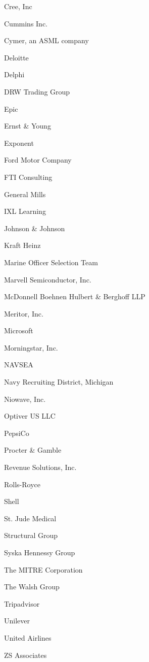 \documentclass[twoside]{article}
\begin{document}
\begin{center}
\begin{multicols}{5}
\begin{FlushLeft}
\begin{compactitem}
\item Cree, Inc
\item Cummins Inc.
\item Cymer, an ASML company
\item Deloitte
\item Delphi
\item DRW Trading Group
\item Epic
\item Ernst \& Young
\item Exponent
\item Ford Motor Company
\item FTI Consulting
\item General Mills
\item IXL Learning
\item Johnson \& Johnson
\item Kraft Heinz
\item Marine Officer Selection Team
\item Marvell Semiconductor, Inc.
\item McDonnell Boehnen Hulbert \& Berghoff LLP
\item Meritor, Inc.
\item Microsoft
\item Morningstar, Inc.
\item NAVSEA
\item Navy Recruiting District, Michigan
\item Niowave, Inc.
\item Optiver US LLC
\item PepsiCo
\item Procter \& Gamble
\item Revenue Solutions, Inc.
\item Rolls-Royce
\item Shell
\item St. Jude Medical
\item Structural Group
\item Syska Hennessy Group
\item The MITRE Corporation
\item The Walsh Group
\item Tripadvisor
\item Unilever
\item United Airlines
\item ZS Associates
\end{compactitem}
        \end{FlushLeft}
        \vspace{1em}

\end{multicols}
\end{center}
\end{document}
